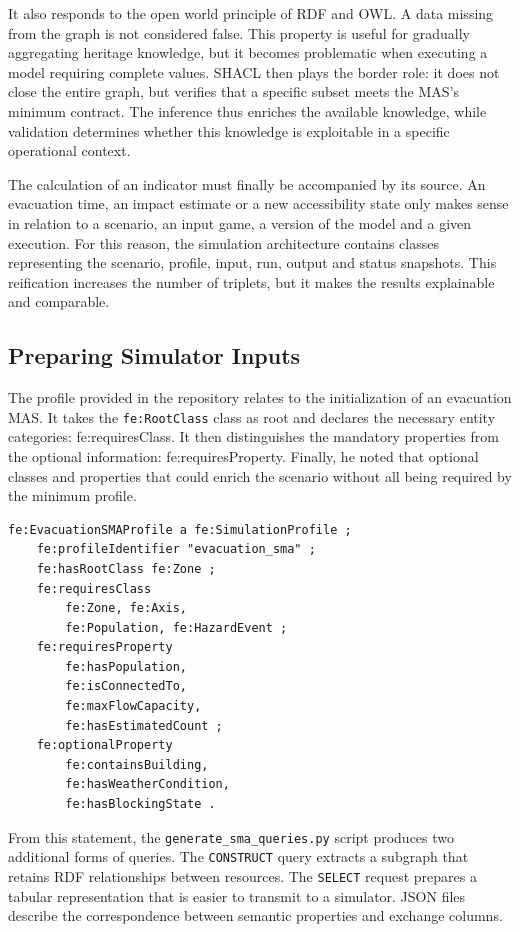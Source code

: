 \documentclass{article}
\begin{document}
It also responds to the open world principle of RDF and OWL. A data missing from the graph is not considered false. This property is useful for gradually aggregating heritage knowledge, but it becomes problematic when executing a model requiring complete values. SHACL then plays the border role: it does not close the entire graph, but verifies that a specific subset meets the MAS's minimum contract. The inference thus enriches the available knowledge, while validation determines whether this knowledge is exploitable in a specific operational context.

The calculation of an indicator must finally be accompanied by its source. An evacuation time, an impact estimate or a new accessibility state only makes sense in relation to a scenario, an input game, a version of the model and a given execution. For this reason, the simulation architecture contains classes representing the scenario, profile, input, run, output and status snapshots. This reification increases the number of triplets, but it makes the results explainable and comparable.

\subsection{Preparing Simulator Inputs}

The profile provided in the repository relates to the initialization of an evacuation MAS. It takes the \texttt{fe:RootClass} class as root and declares the necessary entity categories: fe:requiresClass. It then distinguishes the mandatory properties from the optional information: fe:requiresProperty. Finally, he noted that optional classes and properties that could enrich the scenario without all being required by the minimum profile.

\begin{lstlisting}[language=Turtle,caption={Extract from MAS Evacuation Declaratory Contract}]
fe:EvacuationSMAProfile a fe:SimulationProfile ;
    fe:profileIdentifier "evacuation_sma" ;
    fe:hasRootClass fe:Zone ;
    fe:requiresClass
        fe:Zone, fe:Axis,
        fe:Population, fe:HazardEvent ;
    fe:requiresProperty
        fe:hasPopulation,
        fe:isConnectedTo,
        fe:maxFlowCapacity,
        fe:hasEstimatedCount ;
    fe:optionalProperty
        fe:containsBuilding,
        fe:hasWeatherCondition,
        fe:hasBlockingState .
\end{lstlisting}

From this statement, the \texttt{generate\_sma\_queries.py} script produces two additional forms of queries. The \texttt{CONSTRUCT} query extracts a subgraph that retains RDF relationships between resources. The \texttt{SELECT} request prepares a tabular representation that is easier to transmit to a simulator. JSON files describe the correspondence between semantic properties and exchange columns.
\end{document}
